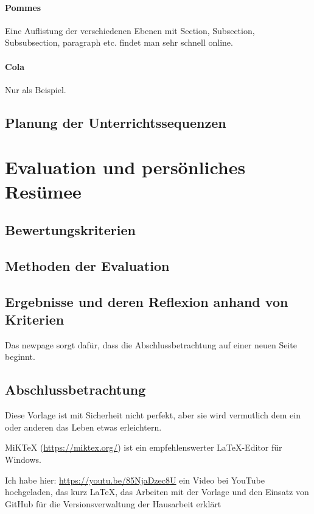 	\paragraph{Pommes}
	Eine Auflistung der verschiedenen Ebenen mit Section, Subsection, Subsubsection, paragraph etc. findet man sehr schnell online.
	
	\paragraph{Cola}
	Nur als Beispiel.
	
	\subsection{Planung der Unterrichtssequenzen}
    
	
	\newpage
	\section{Evaluation und persönliches Resümee}
	\subsection{Bewertungskriterien}
	\subsection{Methoden der Evaluation}
	\subsection{Ergebnisse und deren Reflexion anhand von Kriterien}
	Das newpage sorgt dafür, dass die Abschlussbetrachtung auf einer neuen Seite beginnt.
	\newpage
	\subsection{Abschlussbetrachtung}
	Diese Vorlage ist mit Sicherheit nicht perfekt, aber sie wird vermutlich dem ein oder anderen das Leben etwas erleichtern.
	
	MiKTeX (\href{https://miktex.org/}{https://miktex.org/}) ist ein empfehlenswerter \LaTeX{}-Editor für Windows.
	
	Ich habe hier: \href{https://youtu.be/85NjaDzec8U}{https://youtu.be/85NjaDzec8U} ein Video bei YouTube hochgeladen, das kurz \LaTeX{}, das Arbeiten mit der Vorlage und den Einsatz von GitHub für die Versionsverwaltung der Hausarbeit erklärt 
	
	
	\newpage
	\thispagestyle{empty}
	
	
	
